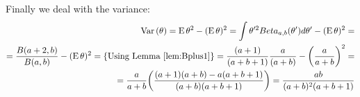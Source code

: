 \documentclass[a4paper,twoside=false,abstract=false,numbers=noenddot,
titlepage=false,headings=small,parskip=half,version=last]{scrartcl}
\begin{document}
\begin{solution}
    Finally we deal with the variance: 
    \begin{equation}
        \begin{split}
            {\rm Var}\,(\theta)={\rm E}\,\theta^2 - ({\rm E}\,\theta)^2=
            \int\theta'^2 Beta_{a,b}(\theta')d\theta' - ({\rm E}\,\theta)^2= \\
            = \frac{B(a+2,b)}{B(a,b)} - ({\rm E}\,\theta)^2 = \{\text{Using
            Lemma \ref{lem:Bplus1}}\}=
            \frac{(a+1)}{(a+b+1)}\frac{a}{(a+b)} - \bigg(\frac{a}{a+b}\bigg)^2 =
            \\
            = \frac{a}{a+b}\bigg(\frac{(a+1)(a+b)-a(a+b+1)}{(a+b)(a+b+1)}\bigg)
            = \frac{ab}{(a+b)^2(a+b+1)}
        \end{split}    
    \end{equation}

\end{solution}
\end{document}
